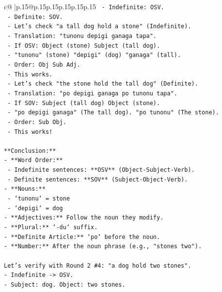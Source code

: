 \documentclass{article}
\begin{document}
{\begin{supertabular}{c@{$\;$}|p{.15\linewidth}@{}p{.15\linewidth}p{.15\linewidth}p{.15\linewidth}p{.15\linewidth}p{.15\linewidth}}
{{{\texttt{  {-} Indefinite: OSV.} \\
\texttt{  {-} Definite: SOV.} \\
\texttt{  {-} Let's check "a tall dog hold a stone" (Indefinite).} \\
\texttt{    {-} Translation: "tunonu depigi ganaga tapa".} \\
\texttt{    {-} If OSV: Object (stone) Subject (tall dog).} \\
\texttt{    {-} "tunonu" (stone) "depigi" (dog) "ganaga" (tall).} \\
\texttt{    {-} Order: Obj Sub Adj.} \\
\texttt{    {-} This works.} \\
\texttt{  {-} Let's check "the stone hold the tall dog" (Definite).} \\
\texttt{    {-} Translation: "po depigi ganaga po tunonu tapa".} \\
\texttt{    {-} If SOV: Subject (tall dog) Object (stone).} \\
\texttt{    {-} "po depigi ganaga" (The tall dog). "po tunonu" (The stone).} \\
\texttt{    {-} Order: Sub Obj.} \\
\texttt{    {-} This works!} \\
\\ 
\texttt{**Conclusion:**} \\
\texttt{{-} **Word Order:**} \\
\texttt{  {-} Indefinite sentences: **OSV** (Object{-}Subject{-}Verb).} \\
\texttt{  {-} Definite sentences: **SOV** (Subject{-}Object{-}Verb).} \\
\texttt{{-} **Nouns:**} \\
\texttt{  {-} `tunonu` = stone} \\
\texttt{  {-} `depigi` = dog} \\
\texttt{{-} **Adjectives:** Follow the noun they modify.} \\
\texttt{{-} **Plural:** `{-}du` suffix.} \\
\texttt{{-} **Definite Article:** `po` before the noun.} \\
\texttt{{-} **Number:** After the noun phrase (e.g., "stones two").} \\
\\ 
\texttt{Let's verify with Round 2 \#4: "a dog hold two stones".} \\
\texttt{{-} Indefinite {-}> OSV.} \\
\texttt{{-} Subject: dog. Object: two stones.} \\
}}}
\end{supertabular}}
\end{document}
